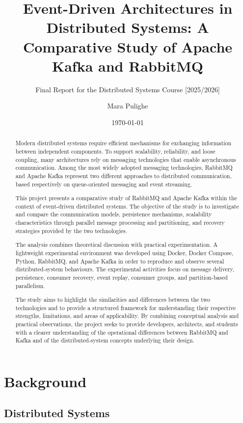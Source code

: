 \documentclass{scrartcl}
\title{\LARGE
    Event-Driven Architectures in Distributed Systems: A Comparative Study of Apache Kafka and RabbitMQ
}
\subtitle{Final Report for the Distributed Systems Course [2025/2026]}
\author{
    Mara Pulighe\\ \emailaddr{mara.pulighe@studio.unibo.it}
}
\date{\today}
\begin{document}
\maketitle

\begin{abstract}

Modern distributed systems require efficient mechanisms for exchanging information between independent components. To support scalability, reliability, and loose coupling, many architectures rely on messaging technologies that enable asynchronous communication. Among the most widely adopted messaging technologies, RabbitMQ and Apache Kafka represent two different approaches to distributed communication, based respectively on queue-oriented messaging and event streaming.

This project presents a comparative study of RabbitMQ and Apache Kafka within the context of event-driven distributed systems. The objective of the study is to investigate and compare the communication models, persistence mechanisms, scalability characteristics through parallel message processing and partitioning, and recovery strategies provided by the two technologies.


The analysis combines theoretical discussion with practical experimentation. A lightweight experimental environment was developed using Docker, Docker Compose, Python, RabbitMQ, and Apache Kafka in order to reproduce and observe several distributed-system behaviours. The experimental activities focus on message delivery, persistence, consumer recovery, event replay, consumer groups, and partition-based parallelism.

The study aims to highlight the similarities and differences between the two technologies and to provide a structured framework for understanding their respective strengths, limitations, and areas of applicability. By combining conceptual analysis and practical observations, the project seeks to provide developers, architects, and students with a clearer understanding of the operational differences between RabbitMQ and Kafka and of the distributed-system concepts underlying their design.

\end{abstract}

\section{Background}
\subsection{Distributed Systems}
\end{document}
